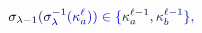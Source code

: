 \documentclass[12pt]{article}
\begin{document}
\makeatletter
\renewcommand*{\@textcolor}[3]{%
  \protect\leavevmode
  \begingroup
    \color#1{#2}#3%
  \endgroup
}
\makeatother
\begin{displaymath}
\mathcolor[RGB]{0,0,15}{\sigma} _ { \mathcolor[RGB]{0,0,30}{\lambda} \mathcolor[RGB]{0,0,45}{-} \mathcolor[RGB]{0,0,60}{1} } \mathcolor[RGB]{0,0,75}{(} \mathcolor[RGB]{0,0,90}{\sigma} _ { \mathcolor[RGB]{0,0,105}{\lambda} } ^ { \mathcolor[RGB]{0,0,120}{-} \mathcolor[RGB]{0,0,135}{1} } \mathcolor[RGB]{0,0,150}{(} \mathcolor[RGB]{0,0,165}{\kappa} _ { \mathcolor[RGB]{0,0,180}{a} } ^ { \mathcolor[RGB]{0,0,195}{\ell} } \mathcolor[RGB]{0,0,210}{)} \mathcolor[RGB]{0,0,225}{)} \mathcolor[RGB]{0,0,240}{\in} \mathcolor[RGB]{0,0,255}{\{} \mathcolor[RGB]{0,15,0}{\kappa} _ { \mathcolor[RGB]{0,15,15}{a} } ^ { \mathcolor[RGB]{0,15,30}{\ell} \mathcolor[RGB]{0,15,45}{-} \mathcolor[RGB]{0,15,60}{1} } \mathcolor[RGB]{0,15,75}{,} \mathcolor[RGB]{0,15,90}{\kappa} _ { \mathcolor[RGB]{0,15,105}{b} } ^ { \mathcolor[RGB]{0,15,120}{\ell} \mathcolor[RGB]{0,15,135}{-} \mathcolor[RGB]{0,15,150}{1} } \mathcolor[RGB]{0,15,165}{\}} \mathcolor[RGB]{0,15,180}{,}
\end{displaymath}
\end{document}
